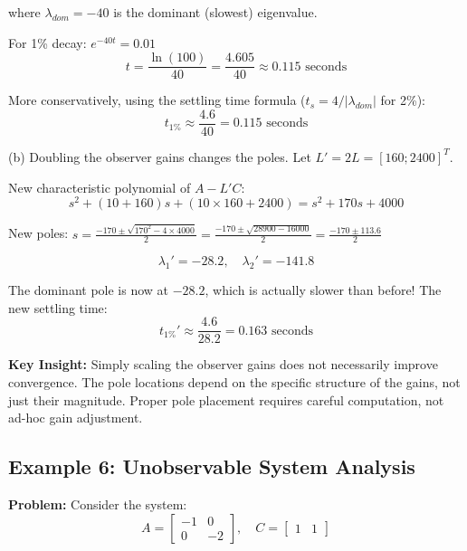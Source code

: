 where $\lambda_{dom} = -40$ is the dominant (slowest) eigenvalue.

For 1\% decay: $e^{-40t} = 0.01$
\begin{equation}
t = \frac{\ln(100)}{40} = \frac{4.605}{40} \approx 0.115 \text{ seconds}
\end{equation}

More conservatively, using the settling time formula ($t_s = 4/|\lambda_{dom}|$ for 2\%):
\begin{equation}
t_{1\%} \approx \frac{4.6}{40} = 0.115 \text{ seconds}
\end{equation}

(b) Doubling the observer gains changes the poles. Let $L' = 2L = [160; 2400]^T$.

New characteristic polynomial of $A - L'C$:
\begin{equation}
s^2 + (10 + 160)s + (10 \times 160 + 2400) = s^2 + 170s + 4000
\end{equation}

New poles: $s = \frac{-170 \pm \sqrt{170^2 - 4 \times 4000}}{2} = \frac{-170 \pm \sqrt{28900 - 16000}}{2} = \frac{-170 \pm 113.6}{2}$

\begin{equation}
\lambda_1' = -28.2, \quad \lambda_2' = -141.8
\end{equation}

The dominant pole is now at $-28.2$, which is actually slower than before! The new settling time:
\begin{equation}
t_{1\%}' \approx \frac{4.6}{28.2} = 0.163 \text{ seconds}
\end{equation}

\textbf{Key Insight:} Simply scaling the observer gains does not necessarily improve convergence. The pole locations depend on the specific structure of the gains, not just their magnitude. Proper pole placement requires careful computation, not ad-hoc gain adjustment.

\hrulefill

\subsection{Example 6: Unobservable System Analysis}

\textbf{Problem:} Consider the system:
\begin{equation}
A = \begin{bmatrix} -1 & 0 \\ 0 & -2 \end{bmatrix}, \quad
C = \begin{bmatrix} 1 & 1 \end{bmatrix}
\end{equation}

